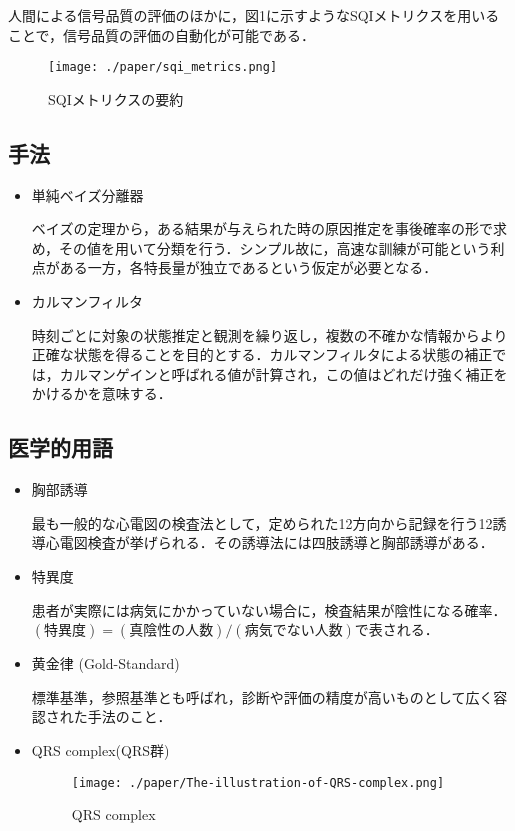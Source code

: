 \documentclass[dvipdfmx]{jsarticle}
\begin{document}
人間による信号品質の評価のほかに，図1に示すようなSQIメトリクスを用いることで，信号品質の評価の自動化が可能である．
\begin{figure}[htbp]
\begin{center}
\texttt{[image: ./paper/sqi\_metrics.png]}
\end{center}
\caption{SQIメトリクスの要約}
\end{figure}
\subsection{手法}
\begin{itemize}
    \item 単純ベイズ分離器

    \noindent
    ベイズの定理から，ある結果が与えられた時の原因推定を事後確率の形で求め，その値を用いて分類を行う．シンプル故に，高速な訓練が可能という利点がある一方，各特長量が独立であるという仮定が必要となる．
    \item カルマンフィルタ

    \noindent
    時刻ごとに対象の状態推定と観測を繰り返し，複数の不確かな情報からより正確な状態を得ることを目的とする．カルマンフィルタによる状態の補正では，カルマンゲインと呼ばれる値が計算され，この値はどれだけ強く補正をかけるかを意味する．
\end{itemize}
\subsection{医学的用語}
\begin{itemize}
    \item 胸部誘導

    \noindent
    最も一般的な心電図の検査法として，定められた12方向から記録を行う12誘導心電図検査が挙げられる．その誘導法には四肢誘導と胸部誘導がある．
    \item 特異度

    \noindent
    患者が実際には病気にかかっていない場合に，検査結果が陰性になる確率．$(特異度) = (真陰性の人数) / (病気でない人数)$で表される．
    \item 黄金律 (Gold-Standard)

    \noindent
    標準基準，参照基準とも呼ばれ，診断や評価の精度が高いものとして広く容認された手法のこと．
    \item QRS complex(QRS群)
    \begin{figure}[htbp]
        \begin{center}
        \texttt{[image: ./paper/The-illustration-of-QRS-complex.png]}
        \end{center}
        \caption{QRS complex \cite{three}}
    \end{figure}
\end{itemize}
\end{document}
